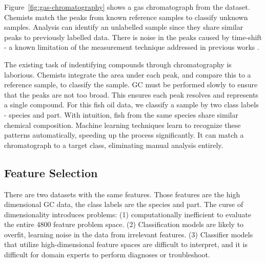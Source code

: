 \documentclass[runningheads]{llncs}
\begin{document}
Figure~\ref{fig:gas-chromatography} shows a gas chromatograph from the dataset. Chemists match the peaks from known reference samples to classify unknown samples. 
Analysis can identify an unlabelled sample since they share similar peaks to previously labelled data.
There is noise in the peaks caused by time-shift - a known limitation of the measurement technique addressed in previous works \cite{tomasi2004correlation,zhang2008two}.

The existing task \cite{eder1995gas,restek2018high} of indentifying compounds through chromatography is laborious.
Chemists integrate the area under each peak, and compare this to a reference sample, to classify the sample.
GC must be performed slowly to ensure that the peaks are not too broad.
This ensures each peak resolves and represents a single compound.
For this fish oil data, we classify a sample by two class labels - species and part. 
With intuition, fish from the same species share similar chemical composition.
Machine learning techniques learn to recognize these patterns automatically, speeding up the process significantly. 
It can match a chromatograph to a target class, eliminating manual analysis entirely. 

\subsection{Feature Selection}
\label{sec:background-feature-selection}


There are two datasets with the same features. 
Those features are the high dimensional GC data, the class labels are the species and part.
The curse of dimensionality \cite{koppen2000curse} introduces problems: (1) computationally inefficient to evaluate the entire 4800 feature problem space. (2) Classification models are likely to overfit, learning noise in the data from irrelevant features. (3) Classifier models that utilize high-dimensional feature spaces are difficult to interpret, and it is difficult for domain experts to perform diagnoses or troubleshoot.
\end{document}
